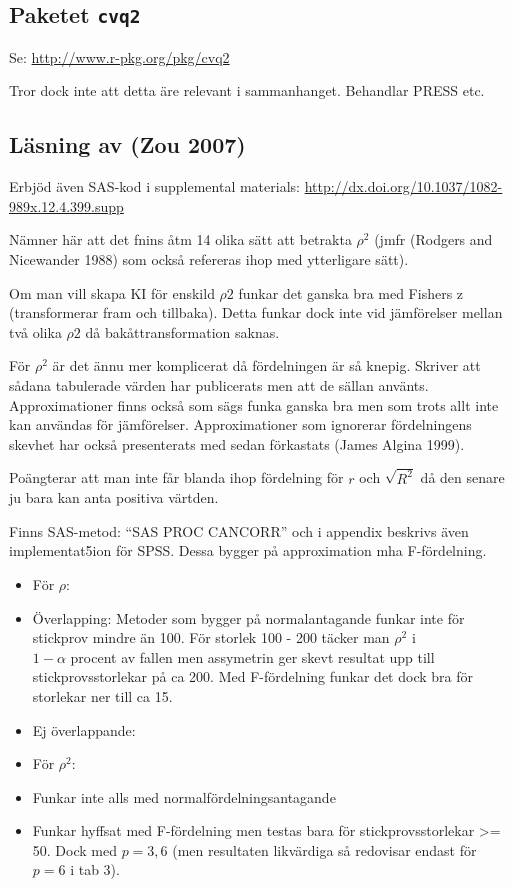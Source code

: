 \documentclass[]{article}
\providecommand{\tightlist}{%
  \setlength{\itemsep}{0pt}\setlength{\parskip}{0pt}}
\begin{document}
\subsection{\texorpdfstring{Paketet
\texttt{cvq2}}{Paketet cvq2}}\label{paketet-cvq2}

Se: \url{http://www.r-pkg.org/pkg/cvq2}

Tror dock inte att detta äre relevant i sammanhanget. Behandlar PRESS
etc.

\subsection{Läsning av (Zou 2007)}\label{lasning-av-zou2007}

Erbjöd även SAS-kod i supplemental materials:
\url{http://dx.doi.org/10.1037/1082-989x.12.4.399.supp}

Nämner här att det fnins åtm 14 olika sätt att betrakta \(\rho^2\) (jmfr
(Rodgers and Nicewander 1988) som också refereras ihop med ytterligare
sätt).

Om man vill skapa KI för enskild \(\rho2\) funkar det ganska bra med
Fishers z (transformerar fram och tillbaka). Detta funkar dock inte vid
jämförelser mellan två olika \(\rho2\) då bakåttransformation saknas.

För \(\rho^2\) är det ännu mer komplicerat då fördelningen är så knepig.
Skriver att sådana tabulerade värden har publicerats men att de sällan
använts. Approximationer finns också som sägs funka ganska bra men som
trots allt inte kan användas för jämförelser. Approximationer som
ignorerar fördelningens skevhet har också presenterats med sedan
förkastats (James Algina 1999).

Poängterar att man inte får blanda ihop fördelning för \(r\) och
\(\sqrt{R^2}\) då den senare ju bara kan anta positiva värtden.

Finns SAS-metod: ``SAS PROC CANCORR'' och i appendix beskrivs även
implementat5ion för SPSS. Dessa bygger på approximation mha
F-fördelning.

\begin{itemize}
\tightlist
\item
  För \(\rho\):
\item
  Överlapping: Metoder som bygger på normalantagande funkar inte för
  stickprov mindre än 100. För storlek 100 - 200 täcker man \(\rho^2\)
  i\\
  \(1-\alpha\) procent av fallen men assymetrin ger skevt resultat upp
  till stickprovsstorlekar på ca 200. Med F-fördelning funkar det dock
  bra för storlekar ner till ca 15.
\item
  Ej överlappande:
\item
  För \(\rho^2\):
\item
  Funkar inte alls med normalfördelningsantagande
\item
  Funkar hyffsat med F-fördelning men testas bara för
  stickprovsstorlekar \textgreater{}= 50. Dock med \(p = 3, 6\) (men
  resultaten likvärdiga så redovisar endast för \(p = 6\) i tab 3).
\end{itemize}
\end{document}
